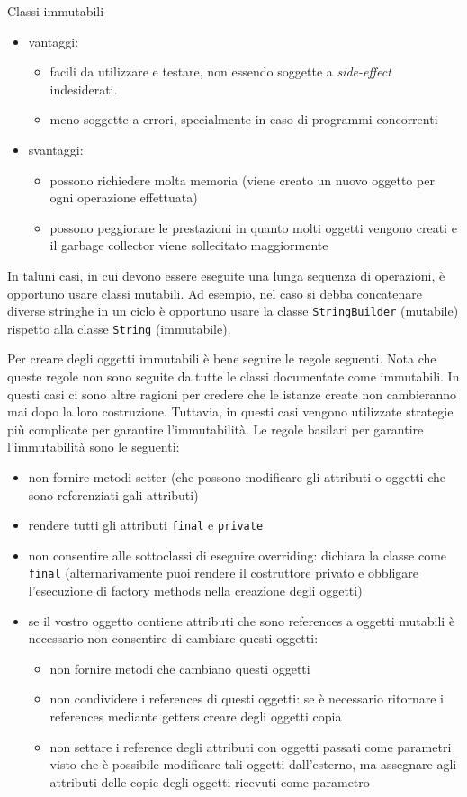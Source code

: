 \documentclass{article}
\begin{document}
Classi immutabili
\begin{itemize}
\item vantaggi:
\begin{itemize}
\item facili da utilizzare e testare, non essendo soggette a \emph{side-effect} indesiderati.
\item meno soggette a errori, specialmente in caso di programmi concorrenti
\end{itemize}
\item svantaggi:
\begin{itemize}
\item possono richiedere molta memoria (viene creato un nuovo oggetto per ogni operazione effettuata)
\item possono peggiorare le prestazioni in quanto molti oggetti vengono creati e il garbage collector viene sollecitato maggiormente
\end{itemize}
\end{itemize}

In taluni casi, in cui devono essere eseguite una lunga sequenza di operazioni, è opportuno usare classi mutabili.
Ad esempio, nel caso si debba concatenare diverse stringhe in un ciclo è opportuno usare la classe
\texttt{StringBuilder} (mutabile) rispetto alla classe \texttt{String} (immutabile).


Per creare degli oggetti immutabili \`e bene seguire le regole seguenti. Nota che queste regole non sono seguite da tutte le classi documentate come immutabili. In questi casi ci sono altre ragioni per credere  che le istanze create non cambieranno mai dopo la loro costruzione. Tuttavia, in questi casi vengono utilizzate strategie pi\`u complicate per garantire l'immutabilit\`a. Le regole basilari per garantire l'immutabilit\`a sono le seguenti:
\begin{itemize}
\item non fornire metodi setter (che possono modificare gli attributi o oggetti che sono referenziati gali attributi)
\item rendere tutti gli attributi \texttt{final} e \texttt{private}
\item non consentire alle sottoclassi di eseguire overriding: dichiara la classe come \texttt{final} (alternarivamente puoi rendere il costruttore privato e obbligare l'esecuzione di factory methods nella creazione degli oggetti)
\item se il vostro oggetto contiene attributi che sono references a oggetti mutabili \`e necessario non consentire di cambiare questi oggetti:
\begin{itemize}
\item non fornire metodi che cambiano questi oggetti
\item non condividere i references di questi oggetti: se \`e necessario ritornare i references mediante getters creare degli oggetti copia
\item non settare i reference degli attributi con oggetti passati come parametri visto che \`e possibile modificare tali oggetti dall'esterno, ma assegnare agli attributi delle copie degli oggetti ricevuti come parametro
\end{itemize} 
\end{itemize}  
\end{document}
